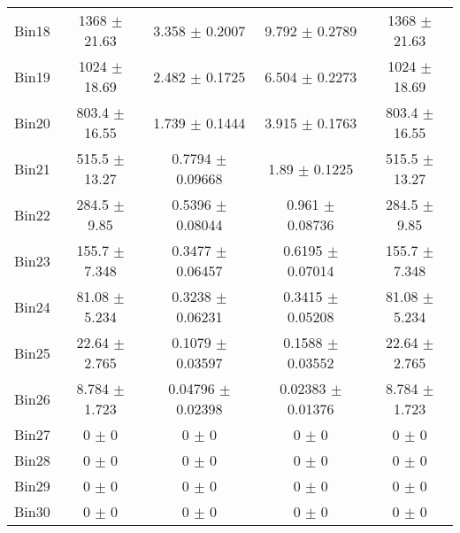 \begin{tabular}{@{\extracolsep{4pt}}lcccc@{}}
     Bin18 & 1368 $\pm$ 21.63 & 3.358 $\pm$ 0.2007 & 9.792 $\pm$ 0.2789 & 1368 $\pm$ 21.63 \\ 
     Bin19 & 1024 $\pm$ 18.69 & 2.482 $\pm$ 0.1725 & 6.504 $\pm$ 0.2273 & 1024 $\pm$ 18.69 \\ 
     Bin20 & 803.4 $\pm$ 16.55 & 1.739 $\pm$ 0.1444 & 3.915 $\pm$ 0.1763 & 803.4 $\pm$ 16.55 \\ 
     Bin21 & 515.5 $\pm$ 13.27 & 0.7794 $\pm$ 0.09668 & 1.89 $\pm$ 0.1225 & 515.5 $\pm$ 13.27 \\ 
     Bin22 & 284.5 $\pm$ 9.85 & 0.5396 $\pm$ 0.08044 & 0.961 $\pm$ 0.08736 & 284.5 $\pm$ 9.85 \\ 
     Bin23 & 155.7 $\pm$ 7.348 & 0.3477 $\pm$ 0.06457 & 0.6195 $\pm$ 0.07014 & 155.7 $\pm$ 7.348 \\ 
     Bin24 & 81.08 $\pm$ 5.234 & 0.3238 $\pm$ 0.06231 & 0.3415 $\pm$ 0.05208 & 81.08 $\pm$ 5.234 \\ 
     Bin25 & 22.64 $\pm$ 2.765 & 0.1079 $\pm$ 0.03597 & 0.1588 $\pm$ 0.03552 & 22.64 $\pm$ 2.765 \\ 
     Bin26 & 8.784 $\pm$ 1.723 & 0.04796 $\pm$ 0.02398 & 0.02383 $\pm$ 0.01376 & 8.784 $\pm$ 1.723 \\ 
     Bin27 & 0 $\pm$ 0 & 0 $\pm$ 0 & 0 $\pm$ 0 & 0 $\pm$ 0 \\ 
     Bin28 & 0 $\pm$ 0 & 0 $\pm$ 0 & 0 $\pm$ 0 & 0 $\pm$ 0 \\ 
     Bin29 & 0 $\pm$ 0 & 0 $\pm$ 0 & 0 $\pm$ 0 & 0 $\pm$ 0 \\ 
     Bin30 & 0 $\pm$ 0 & 0 $\pm$ 0 & 0 $\pm$ 0 & 0 $\pm$ 0 \\ 
\hline\hline
  \end{tabular}
